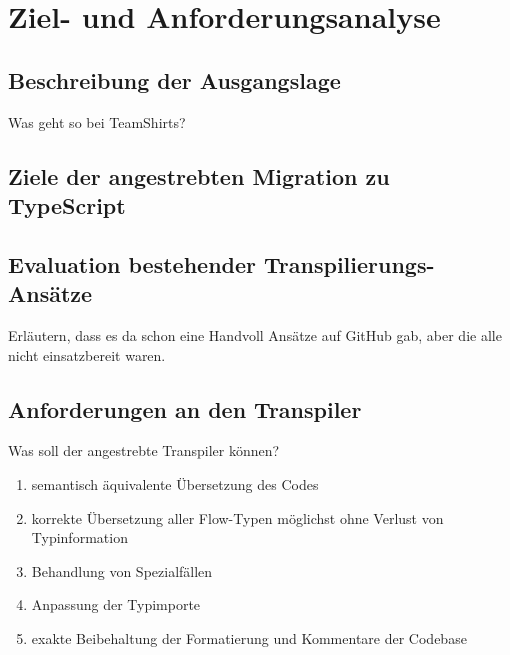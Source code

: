 \chapter{Ziel- und Anforderungsanalyse}

\section{Beschreibung der Ausgangslage}

Was geht so bei TeamShirts?

\section{Ziele der angestrebten Migration zu TypeScript}

\section{Evaluation bestehender Transpilierungs-Ansätze}

Erläutern, dass es da schon eine Handvoll Ansätze auf GitHub gab, aber die alle nicht einsatzbereit waren.

\section{Anforderungen an den Transpiler}

Was soll der angestrebte Transpiler können?

\begin{enumerate}
  \item semantisch äquivalente Übersetzung des Codes
  \item korrekte Übersetzung aller Flow-Typen möglichst ohne Verlust von Typinformation
  \item Behandlung von Spezialfällen
  \item Anpassung der Typimporte
  \item exakte Beibehaltung der Formatierung und Kommentare der Codebase
\end{enumerate}


